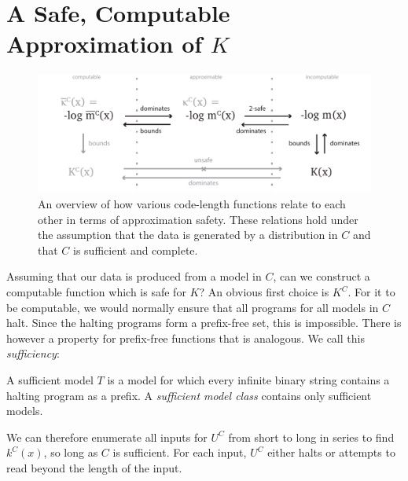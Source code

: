 \section{A Safe, Computable Approximation of $K$}

\begin{figure}[tb]
  \centering
  \includegraphics[width=\textwidth]{./images/approximation-map.pdf}
  \caption{\small An overview of how various code-length functions relate to each other in terms of approximation safety. These relations hold under the assumption that the data is generated by a distribution in $C$ and that $C$ is sufficient and complete.}
  \label{fig:approximation-map}
\end{figure}

Assuming that our data is produced from a model in $C$, can we construct a computable function which is safe for $K$? An obvious first choice is $K^C$. For it to be computable, we would normally ensure that all programs for all models in $C$ halt. Since the halting programs form a prefix-free set, this is impossible. There is however a property for prefix-free functions that is analogous. We call this \emph{sufficiency}:

\begin{definition}
A sufficient model $T$ is a model for which every infinite binary string contains a halting program as a prefix. A \emph{sufficient model class} contains only sufficient models. 
\end{definition}


We can therefore enumerate all inputs for $U^C$ from short to long in series to find $k^C(x)$, so long as $C$ is sufficient. For each input, $U^C$ either halts or attempts to read beyond the length of the input. 

